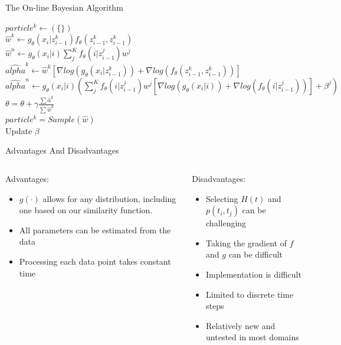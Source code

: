 \documentclass[compress]{beamer}
\begin{document}
\begin{frame}{The On-line Bayesian Algorithm}
\begin{algorithm}[H]
$particle^k \leftarrow (\{\})$ \\
 {
    $\hat{w}^k \leftarrow g_{\theta}(x_i | z_{i-1}^k) 
                            f_{\theta}(z_{i-1}^k, z_{i-1}^k)$ \\
    $\hat{w}^n \leftarrow g_{\theta}(x_i | i) 
                            \sum_j^K f_{\theta}(i |  z_{i-1}^j) 
                            w^j$ \\

    $\hat{alpha}^k \leftarrow \hat{w}^k 
                              [ \nabla log(g_{\theta}(x_i | z_{i-1}^k))  +
                                \nabla log(f_{\theta}(z_{i-1}^k, z_{i-1}^k))]$ \\
    $\hat{alpha}^n \leftarrow g_{\theta}(x_i | i)
                              (\sum_j^K f_{\theta}(i |  z_{i-1}^j) w^j
                               [ \nabla log( g_{\theta}(x_i | i) ) +
                                 \nabla log(f_{\theta}(i |  z_{i-1}^j))] + 
                                 \beta^j)$ \\
    $\theta = \theta + \gamma \frac{\sum \hat{\alpha}^k}{\sum \hat{w}^k} $\\
    $particle^k = Sample(\hat{w})$ \\
    Update $\beta$ \\
}

\end{algorithm}
\end{frame}

\begin{frame}{Advantages And Disadvantages}
\begin{columns}
\begin{column}[1]{5cm}
Advantages:
\begin{itemize}
\item $g(\cdot)$ allows for any distribution, including one based on our
similarity function.
\item All parameters can be estimated from the data
\item Processing each data point takes constant time
\end{itemize}
\end{column}

\begin{column}[2]{5cm}
Disadvantages:
\begin{itemize}
\item Selecting $H(t)$ and $p(t_i, t_j)$ can be challenging
\item Taking the gradient of $f$ and $g$ can be difficult
\item Implementation is difficult
\item Limited to discrete time steps
\item Relatively new and untested in most domains
\end{itemize}
\end{column}

\end{columns}
\end{frame}
\end{document}
